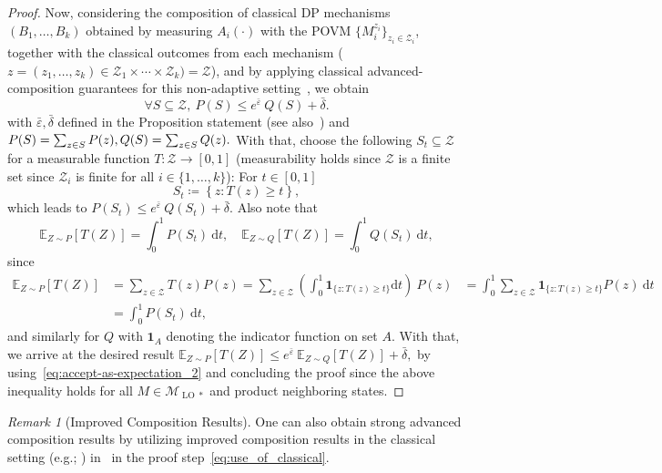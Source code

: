 \documentclass[11pt]{article}
\theoremstyle{plain}
\theoremstyle{remark}
\newtheorem{remark}[theo]{Remark}
\begin{document}
\begin{proof}
Now, considering the composition of classical DP mechanisms $(B_1, \ldots, B_k)$ obtained by measuring $A_i(\cdot)$ with the POVM $\{M_i^{z_i}\}_{z_i \in \mathcal{Z}_i}$, together with the classical outcomes from each mechanism ($z= (z_1,\ldots, z_k) \in \mathcal{Z}_1 \times \cdots \times \mathcal{Z}_k)= \mathcal{Z}$), and  by applying classical advanced-composition guarantees for this non-adaptive setting~\cite[Theorem~3.5]{KairouzOhVi17}, we obtain 
\begin{equation}\label{eq:use_of_classical}
    \forall S \subseteq \mathcal{Z}, \  P(S) \leq e^{\bar{\varepsilon}} \ Q(S) + \bar{\delta}.
\end{equation}
with $\bar{\varepsilon}, \bar{\delta}$ defined in the Proposition statement (see also~) and 
$
    P(S) = \sum_{z \in S} P(z),  \\  Q(S) = \sum_{z \in S} Q(z).
$
With that, choose the following $S_t \subseteq \mathcal{Z}$ for a measurable function $T: \mathcal{Z} \to [0,1]$ (measurability holds since $\mathcal{Z}$ is a finite set since $\mathcal{Z}_i$ is finite for all $i\in\{1,\ldots, k\}$): For $t \in [0,1]$
\begin{equation}
    S_t \coloneqq \left\{ z: T(z) \geq t  \right\},
\end{equation}
which leads to $  P(S_t) \leq e^{\bar{\varepsilon}} \ Q(S_t) + \bar{\delta}.$
Also note that 
\begin{equation}
    \mathbb{E}_{Z\sim P}[T(Z)] = \int_{0}^1 P(S_t)\  \mathrm{d}t, \quad  \mathbb{E}_{Z\sim Q}[T(Z)] = \int_{0}^1 Q(S_t)\  \mathrm{d}t, 
\end{equation}
since 
\begin{align}
    \mathbb{E}_{Z\sim P}[T(Z)] & =\sum_{z \in \mathcal{Z}}  T(z) P(z)= \sum_{z \in \mathcal{Z}} \left(\int_{0}^1 \mathbf{1}_{\{z: T(z) \geq t\}} \mathrm{d}t \right) \  P(z) 
    &=\int_{0}^1  \sum_{z \in \mathcal{Z}} \mathbf{1}_{\{z: T(z) \geq t\}} P(z) \ \mathrm{d}t \\ 
    &=\int_{0}^1  P(S_t) \ \mathrm{d}t,
\end{align}
and similarly for $Q$ with $\mathbf{1}_{A}$ denoting the indicator function on set $A$.
With that, we arrive at the desired result $ \mathbb{E}_{Z\sim P}[T(Z)] \leq e^{\bar{\varepsilon}} \ \mathbb{E}_{Z\sim Q}[T(Z)] + \bar{\delta},$
 by using~\eqref{eq:accept-as-expectation_2} and concluding the proof since the above inequality holds for all $M \in \mathcal{M}_{\operatorname{LO}*}$ and product neighboring states.
\end{proof}
\begin{remark}[Improved Composition Results]
    One can also obtain strong advanced composition results by utilizing improved composition results in the classical setting (e.g.; \cite[Theorem~3.3]{KairouzOhVi17}) in~ in the proof step~\eqref{eq:use_of_classical}.
    
\end{remark}
\end{document}
